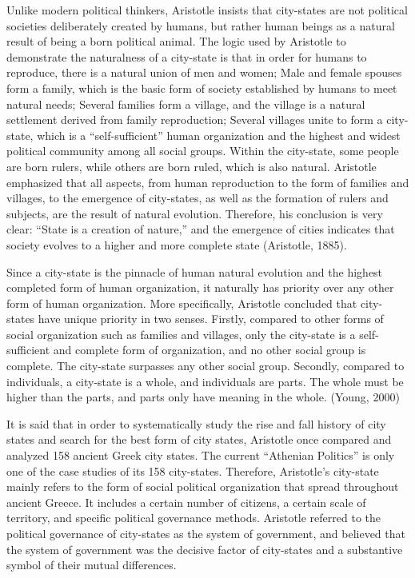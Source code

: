 \documentclass[11pt]{article}
\begin{document}
Unlike modern political thinkers, Aristotle insists that city-states are not political societies deliberately created by humans, but rather human beings as a natural result of being a born political animal. The logic used by Aristotle to demonstrate the naturalness of a city-state is that in order for humans to reproduce, there is a natural union of men and women; Male and female spouses form a family, which is the basic form of society established by humans to meet natural needs; Several families form a village, and the village is a natural settlement derived from family reproduction; Several villages unite to form a city-state, which is a “self-sufficient” human organization and the highest and widest political community among all social groups. Within the city-state, some people are born rulers, while others are born ruled, which is also natural. Aristotle emphasized that all aspects, from human reproduction to the form of families and villages, to the emergence of city-states, as well as the formation of rulers and subjects, are the result of natural evolution. Therefore, his conclusion is very clear: “State is a creation of nature,” and the emergence of cities indicates that society evolves to a higher and more complete state (Aristotle, 1885).

Since a city-state is the pinnacle of human natural evolution and the highest completed form of human organization, it naturally has priority over any other form of human organization. More specifically, Aristotle concluded that city-states have unique priority in two senses. Firstly, compared to other forms of social organization such as families and villages, only the city-state is a self-sufficient and complete form of organization, and no other social group is complete. The city-state surpasses any other social group. Secondly, compared to individuals, a city-state is a whole, and individuals are parts. The whole must be higher than the parts, and parts only have meaning in the whole. (Young, 2000)

It is said that in order to systematically study the rise and fall history of city states and search for the best form of city states, Aristotle once compared and analyzed 158 ancient Greek city states. The current “Athenian Politics” is only one of the case studies of its 158 city-states. Therefore, Aristotle's city-state mainly refers to the form of social political organization that spread throughout ancient Greece. It includes a certain number of citizens, a certain scale of territory, and specific political governance methods. Aristotle referred to the political governance of city-states as the system of government, and believed that the system of government was the decisive factor of city-states and a substantive symbol of their mutual differences.
\end{document}
